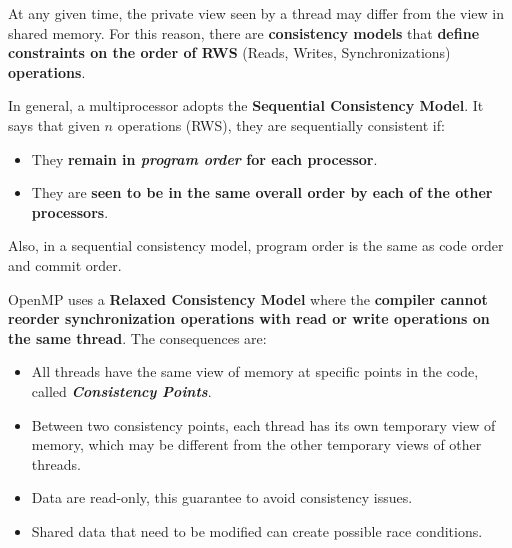 \noindent
At any given time, the private view seen by a thread may differ from the view in shared memory. For this reason, there are \textbf{consistency models} that \textbf{define constraints on the order of RWS} (Reads, Writes, Synchronizations) \textbf{operations}.

\highspace
In general, a multiprocessor adopts the \textbf{Sequential Consistency Model}. It says that given $n$ operations (RWS), they are sequentially consistent if:
\begin{itemize}
    \item They \textbf{remain in \emph{program order} for each processor}.
    \item They are \textbf{seen to be in the same overall order by each of the other processors}.
\end{itemize}
Also, in a sequential consistency model, program order is the same as code order and commit order.

\highspace
OpenMP uses a \textbf{Relaxed Consistency Model} where the \textbf{compiler cannot reorder synchronization operations with read or write operations on the same thread}. The consequences are:
\begin{itemize}
    \item[\textcolor{Green3}{\ding{51}}] All threads have the same view of memory at specific points in the code, called \textbf{\emph{Consistency Points}}.
    \item[\textcolor{Green3}{\ding{51}}] Between two consistency points, each thread has its own temporary view of memory, which may be different from the other temporary views of other threads.
    \item[\textcolor{Green3}{\ding{51}}] Data are read-only, this guarantee to avoid consistency issues.
    \item[\textcolor{Red2}{\ding{55}}] Shared data that need to be modified can create possible race conditions.
\end{itemize}

